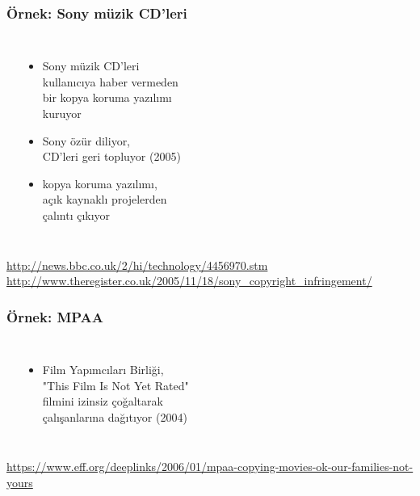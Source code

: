 \documentclass[dvipsnames]{beamer}
\theoremstyle{plain}
\begin{document}
\begin{frame}
  \frametitle{Örnek: Sony müzik CD'leri}

  \begin{columns}
    \begin{center}
    \end{center}

    \begin{itemize}
      \item Sony müzik CD'leri\\
        kullanıcıya haber vermeden\\
        bir kopya koruma yazılımı\\
        kuruyor
      \item Sony özür diliyor,\\
        CD'leri geri topluyor (2005)

      \pause
      \item kopya koruma yazılımı,\\
        açık kaynaklı projelerden\\
        çalıntı çıkıyor
    \end{itemize}
  \end{columns}

  \medskip
  \tiny{\url{http://news.bbc.co.uk/2/hi/technology/4456970.stm}}\\
  \tiny{\url{http://www.theregister.co.uk/2005/11/18/sony_copyright_infringement/}}\\
\end{frame}

\begin{frame}
  \frametitle{Örnek: MPAA}

  \begin{columns}
    \begin{center}
    \end{center}

    \begin{itemize}
      \item Film Yapımcıları Birliği,\\
        "This Film Is Not Yet Rated"\\
        filmini izinsiz çoğaltarak\\
        çalışanlarına dağıtıyor (2004)
    \end{itemize}
  \end{columns}

  \medskip
  \tiny{\url{https://www.eff.org/deeplinks/2006/01/mpaa-copying-movies-ok-our-families-not-yours}}\\
\end{frame}
\end{document}
